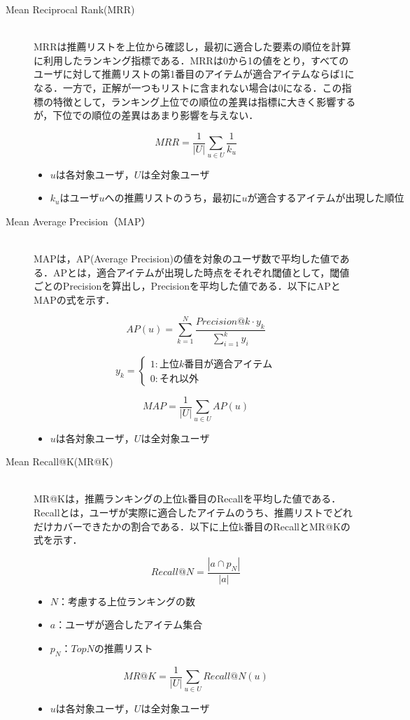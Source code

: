 \documentclass[12pt]{jarticle} %
\begin{document}
\begin{description}
\item[Mean Reciprocal Rank(MRR)]~\\
MRRは推薦リストを上位から確認し，最初に適合した要素の順位を計算に利用したランキング指標である．MRRは0から1の値をとり，すべてのユーザに対して推薦リストの第1番目のアイテムが適合アイテムならば1になる．一方で，正解が一つもリストに含まれない場合は0になる．この指標の特徴として，ランキング上位での順位の差異は指標に大きく影響するが，下位での順位の差異はあまり影響を与えない．

\[
  MRR =
  \frac{1}{|U|}\sum_{u\in U} \frac{1}{k_u}
\]
\begin{itemize}
\item $uは各対象ユーザ，Uは全対象ユーザ$
\item $k_uはユーザuへの推薦リストのうち，最初にuが適合するアイテムが出現した順位$
\end{itemize}


\item[Mean Average Precision（MAP）]~\\
MAPは，AP(Average Precision)の値を対象のユーザ数で平均した値である．APとは，適合アイテムが出現した時点をそれぞれ閾値として，閾値ごとのPrecisionを算出し，Precisionを平均した値である．以下にAPとMAPの式を示す．

\[
  AP(u) =
  \sum_{k=1}^{N} \frac{Precision@k \cdot y_k}{\sum_{i=1}^{k}y_i}
\]

\[
  y_k = \begin{cases}
    1 : 上位k番目が適合アイテム \\
    0 : それ以外
  \end{cases}
\]

\[
  MAP =
  \frac{1}{|U|}\sum_{u\in U} AP(u)
\]
\begin{itemize}
\item $uは各対象ユーザ，Uは全対象ユーザ$
\end{itemize}


\item[Mean Recall@K(MR@K)]~\\
MR@Kは，推薦ランキングの上位k番目のRecallを平均した値である．Recallとは，ユーザが実際に適合したアイテムのうち、推薦リストでどれだけカバーできたかの割合である．以下に上位k番目のRecallとMR@Kの式を示す．

\[
  Recall@N =
  \frac{|a \cap p_N|}{|a|}
\]
\begin{itemize}
\item $N：考慮する上位ランキングの数$
\item $a：ユーザが適合したアイテム集合$
\item $p_N：TopNの推薦リスト$
\end{itemize}

\[
  MR@K =
  \frac{1}{|U|}\sum_{u\in U} Recall@N(u)
\]
\begin{itemize}
\item $uは各対象ユーザ，Uは全対象ユーザ$
\end{itemize}

\end{description}
\end{document}
